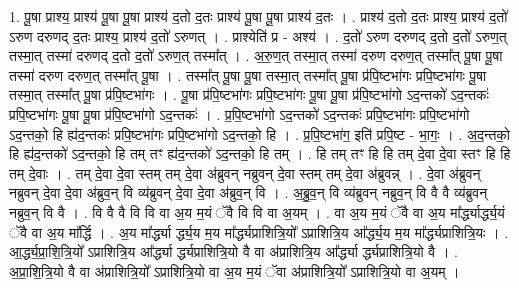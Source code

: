 \documentclass[17pt]{extarticle}
\begin{document}
1. पू॒षा प्राश्य॒ प्राश्य॑ पू॒षा पू॒षा प्राश्य॑ द॒तो द॒तः प्राश्य॑ पू॒षा पू॒षा प्राश्य॑ द॒तः । . प्राश्य॑ द॒तो द॒तः प्राश्य॒ प्राश्य॑ द॒तो॑ ऽरुण दरुणद् द॒तः प्राश्य॒ प्राश्य॑ द॒तो॑ ऽरुणत् । . प्राश्येति॑ प्र - अश्य॑ । . द॒तो॑ ऽरुण दरुणद् द॒तो द॒तो॑ ऽरुण॒त् तस्मा॒त् तस्मा॑ दरुणद् द॒तो द॒तो॑ ऽरुण॒त् तस्मा᳚त् । . अ॒रु॒ण॒त् तस्मा॒त् तस्मा॑ दरुण दरुण॒त् तस्मा᳚त् पू॒षा पू॒षा तस्मा॑ दरुण दरुण॒त् तस्मा᳚त् पू॒षा । . तस्मा᳚त् पू॒षा पू॒षा तस्मा॒त् तस्मा᳚त् पू॒षा प्र॑पि॒ष्टभा॑गः प्रपि॒ष्टभा॑गः पू॒षा तस्मा॒त् तस्मा᳚त् पू॒षा प्र॑पि॒ष्टभा॑गः । . पू॒षा प्र॑पि॒ष्टभा॑गः प्रपि॒ष्टभा॑गः पू॒षा पू॒षा प्र॑पि॒ष्टभा॑गो ऽद॒न्तको॑ ऽद॒न्तकः॑ प्रपि॒ष्टभा॑गः पू॒षा पू॒षा प्र॑पि॒ष्टभा॑गो ऽद॒न्तकः॑ । . प्र॒पि॒ष्टभा॑गो ऽद॒न्तको॑ ऽद॒न्तकः॑ प्रपि॒ष्टभा॑गः प्रपि॒ष्टभा॑गो ऽद॒न्तको॒ हि ह्य॑द॒न्तकः॑ प्रपि॒ष्टभा॑गः प्रपि॒ष्टभा॑गो ऽद॒न्तको॒ हि । . प्र॒पि॒ष्टभा॑ग॒ इति॑ प्रपि॒ष्ट - भा॒गः॒ । . अ॒द॒न्तको॒ हि ह्य॑द॒न्तको॑ ऽद॒न्तको॒ हि तम् तꣳ ह्य॑द॒न्तको॑ ऽद॒न्तको॒ हि तम् । . हि तम् तꣳ हि हि तम् दे॒वा दे॒वा स्तꣳ हि हि तम् दे॒वाः । . तम् दे॒वा दे॒वा स्तम् तम् दे॒वा अ॑ब्रुवन् नब्रुवन् दे॒वा स्तम् तम् दे॒वा अ॑ब्रुवन्न् । . दे॒वा अ॑ब्रुवन् नब्रुवन् दे॒वा दे॒वा अ॑ब्रुव॒न् वि व्य॑ब्रुवन् दे॒वा दे॒वा अ॑ब्रुव॒न् वि । . अ॒ब्रु॒व॒न् वि व्य॑ब्रुवन् नब्रुव॒न् वि वै वै व्य॑ब्रुवन् नब्रुव॒न् वि वै । . वि वै वै वि वि वा अ॒य म॒यं ॅवै वि वि वा अ॒यम् । . वा अ॒य म॒यं ॅवै वा अ॒य मा᳚र्द्ध्यार्द्ध्य॒यं ॅवै वा अ॒य मा᳚र्द्धि । . अ॒य मा᳚र्द्ध्या र्द्ध्य॒य म॒य मा᳚र्द्ध्यप्राशित्रि॒यो᳚ ऽप्राशित्रि॒य आ᳚र्द्ध्य॒य म॒य मा᳚र्द्ध्यप्राशित्रि॒यः । . आ॒र्द्ध्य॒प्रा॒शि॒त्रि॒यो᳚ ऽप्राशित्रि॒य आ᳚र्द्ध्या र्द्ध्यप्राशित्रि॒यो वै वा अ॑प्राशित्रि॒य आ᳚र्द्ध्या र्द्ध्यप्राशित्रि॒यो वै । . अ॒प्रा॒शि॒त्रि॒यो वै वा अ॑प्राशित्रि॒यो᳚ ऽप्राशित्रि॒यो वा अ॒य म॒यं ॅवा अ॑प्राशित्रि॒यो᳚ ऽप्राशित्रि॒यो वा अ॒यम् । \newline
\end{document}
